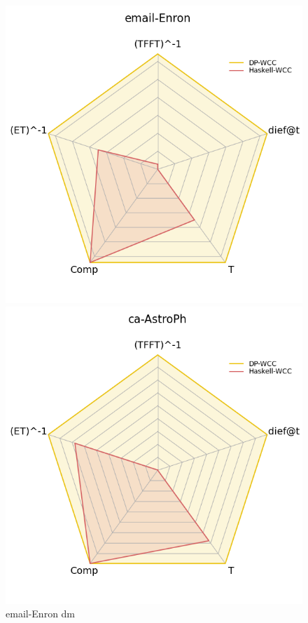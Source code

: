\documentclass[preprint]{elsarticle}
\begin{document}
\begin{figure}[!htb]
    \centering
    \begin{minipage}{0.33\textwidth}
     \includegraphics[width=1\linewidth, height=0.2\textheight]{email_enron_radar}
      \caption{email-Enron \acrshort{dm}}
      \label{fig:dief:rad:1}
    \end{minipage}%
    \begin{minipage}{0.33\textwidth}
     \includegraphics[width=1\linewidth, height=0.2\textheight]{ca_astroph_radar}

\end{minipage}
\end{figure}
\end{document}
